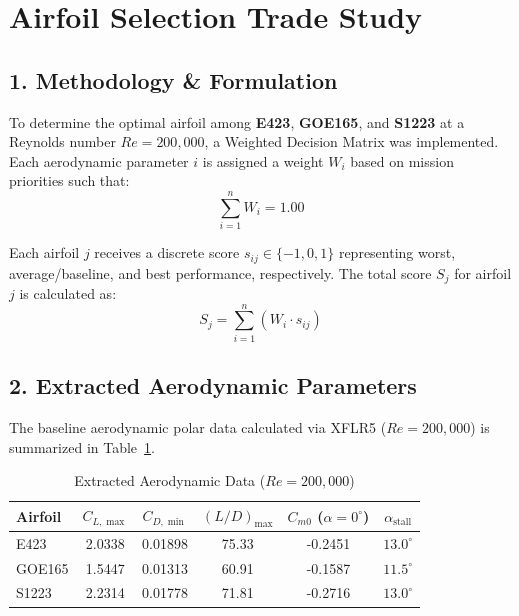 \documentclass{article}
\begin{document}
\section*{Airfoil Selection Trade Study}

\subsection*{1. Methodology \& Formulation}
To determine the optimal airfoil among \textbf{E423}, \textbf{GOE165}, and \textbf{S1223} at a Reynolds number $Re = 200,000$, a Weighted Decision Matrix was implemented. Each aerodynamic parameter $i$ is assigned a weight $W_i$ based on mission priorities such that:
\begin{equation}
    \sum_{i=1}^{n} W_i = 1.00
\end{equation}

Each airfoil $j$ receives a discrete score $s_{ij} \in \{-1, 0, 1\}$ representing worst, average/baseline, and best performance, respectively. The total score $S_j$ for airfoil $j$ is calculated as:
\begin{equation}
    S_j = \sum_{i=1}^{n} \left( W_i \cdot s_{ij} \right)
\end{equation}

\subsection*{2. Extracted Aerodynamic Parameters}
The baseline aerodynamic polar data calculated via XFLR5 ($Re = 200,000$) is summarized in Table~\ref{tab:extracted_data}.

\begin{table}[h!]
\centering
\caption{Extracted Aerodynamic Data ($Re = 200,000$)}
\label{tab:extracted_data}
\begin{tabular}{lccccc}
\toprule
\textbf{Airfoil} & \textbf{$C_{L,\max}$} & \textbf{$C_{D,\min}$} & \textbf{$(L/D)_{\max}$} & \textbf{$C_{m0}$ ($\alpha=0^\circ$)} & \textbf{$\alpha_{\text{stall}}$} \\
\midrule
E423   & 2.0338 & 0.01898 & 75.33 & -0.2451 & $13.0^\circ$ \\
GOE165 & 1.5447 & 0.01313 & 60.91 & -0.1587 & $11.5^\circ$ \\
S1223  & 2.2314 & 0.01778 & 71.81 & -0.2716 & $13.0^\circ$ \\
\bottomrule
\end{tabular}
\end{table}
\end{document}
